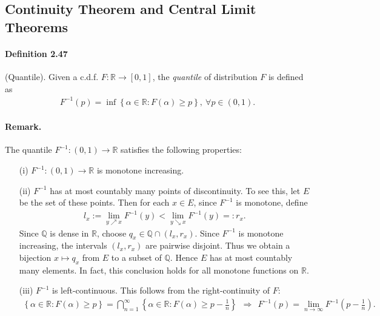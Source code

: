 \documentclass{article}
\numberwithin{equation}{section}
\theoremstyle{plain}
\theoremstyle{definition}
\begin{document}
\newpage
\subsection{Continuity Theorem and Central Limit Theorems}
\paragraph{Definition 2.47\label{def:2.47}} (Quantile). Given a c.d.f. $F:\mathbb{R}\to[0,1]$, the \textit{quantile} of distribution $F$ is defined as
\begin{align*}
	F^{-1}(p)=\inf\left\{\alpha\in\mathbb{R}:F(\alpha)\geq p\right\},\ \forall p\in(0,1).
\end{align*}

\paragraph{Remark.} The quantile $F^{-1}:(0,1)\to\mathbb{R}$ satisfies the following properties:
\begin{itemize}
	\item[(i)] $F^{-1}:(0,1)\to\mathbb{R}$ is monotone increasing.
	\item[(ii)] $F^{-1}$ has at most countably many points of discontinuity. To see this, let $E$ be the set of these points. Then for each $x\in E$, since $F^{-1}$ is monotone, define
	\begin{align*}
		l_x:=\lim_{y\nearrow x} F^{-1}(y) < \lim_{y\searrow x} F^{-1}(y)=:r_x.
	\end{align*}
    Since $\mathbb{Q}$ is dense in $\mathbb{R}$, choose $q_x\in\mathbb{Q}\cap(l_x,r_x)$. Since $F^{-1}$ is monotone increasing, the intervals $(l_x,r_x)$ are pairwise disjoint. Thus we obtain a bijection $x\mapsto q_x$ from $E$ to a subset of $\mathbb{Q}$. Hence $E$ has at most countably many elements. In fact, this conclusion holds for all monotone functions on $\mathbb{R}$.
    
	\item[(iii)] $F^{-1}$ is left-continuous. This follows from the right-continuity of $F$:
	\begin{align*}
		\left\{\alpha\in\mathbb{R}:F(\alpha)\geq p\right\} = \bigcap_{n=1}^\infty\left\{\alpha\in\mathbb{R}:F(\alpha)\geq p-\frac{1}{n}\right\}\ \ \Rightarrow\ \ F^{-1}(p)=\lim_{n\to\infty} F^{-1}\left(p-\frac{1}{n}\right).
	\end{align*}
\end{itemize}
\end{document}
